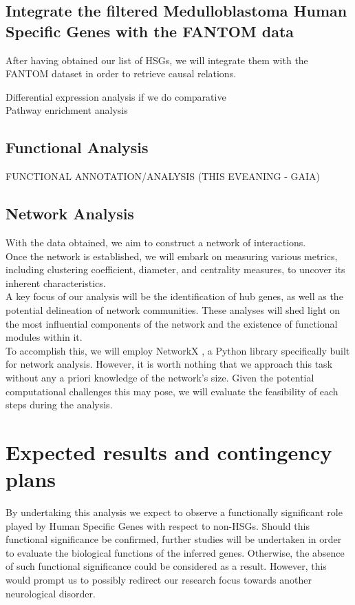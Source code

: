 \documentclass[10pt]{SelfArx} %
\begin{document}
\subsection{Integrate the filtered Medulloblastoma Human Specific Genes with the FANTOM data}
After having obtained our list of HSGs, we will integrate them with the FANTOM \cite{fantom5} dataset in order to retrieve causal relations.

Differential expression analysis if we do comparative \\
Pathway enrichment analysis

\subsection{Functional Analysis}\label{sec:functional_analysis}
FUNCTIONAL ANNOTATION/ANALYSIS (THIS EVEANING - GAIA)

\subsection{Network Analysis}\label{sec:network_analysis}
With the data obtained, we aim to construct a network of interactions. \\
Once the network is established, we will embark on measuring various metrics, including clustering coefficient, diameter, and centrality measures, to uncover its inherent characteristics. \\
A key focus of our analysis will be the identification of hub genes, as well as the potential delineation of network communities. These analyses will shed light on the most influential components of the network and the existence of functional modules within it. \\
To accomplish this, we will employ NetworkX \cite{hagberg2008exploring}, a Python library specifically built for network analysis. However, it is worth nothing that we approach this task without any a priori knowledge of the network's size. Given the potential computational challenges this may pose, we will evaluate the feasibility of each steps during the analysis. 

\section{Expected results and contingency plans}\label{sec:expected_results}
By undertaking this analysis we expect to observe a functionally significant role played by Human Specific Genes with respect to non-HSGs. Should this functional significance be confirmed, further studies will be undertaken in order to evaluate the biological functions of the inferred genes. Otherwise, the absence of such functional significance could be considered as a result. However, this would prompt us to possibly redirect our research focus towards another neurological disorder. 
\end{document}
